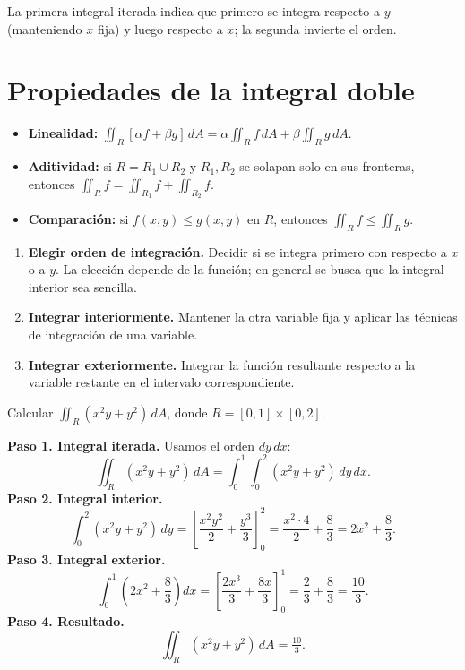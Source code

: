 La primera integral iterada indica que primero se integra respecto a $y$ (manteniendo $x$ fija) y luego respecto a $x$; la segunda invierte el orden.

\section{Propiedades de la integral doble}

\begin{itemize}
    \item \textbf{Linealidad:} $\iint_R [\alpha f+\beta g]\,dA = \alpha\iint_R f\,dA + \beta\iint_R g\,dA$.
    \item \textbf{Aditividad:} si $R=R_1\cup R_2$ y $R_1,R_2$ se solapan solo en sus fronteras, entonces $\iint_R f = \iint_{R_1} f + \iint_{R_2} f$.
    \item \textbf{Comparación:} si $f(x,y)\le g(x,y)$ en $R$, entonces $\iint_R f\le \iint_R g$.
\end{itemize}

\begin{pasos}
\begin{enumerate}
    \item \textbf{Elegir orden de integración.} Decidir si se integra primero con respecto a $x$ o a $y$. La elección depende de la función; en general se busca que la integral interior sea sencilla.
    \item \textbf{Integrar interiormente.} Mantener la otra variable fija y aplicar las técnicas de integración de una variable.
    \item \textbf{Integrar exteriormente.} Integrar la función resultante respecto a la variable restante en el intervalo correspondiente.
\end{enumerate}
\end{pasos}

\begin{example}
Calcular $\displaystyle\iint_R (x^2 y + y^2)\,dA$, donde $R=[0,1]\times[0,2]$.
\begin{myproof}
\textbf{Paso 1. Integral iterada.} Usamos el orden $dy\,dx$:
\[
\iint_R (x^2 y + y^2)\,dA
= \int_0^1\int_0^2 (x^2 y + y^2)\,dy\,dx.
\]
\textbf{Paso 2. Integral interior.}
\[
\int_0^2 (x^2 y + y^2)\,dy
= \left[\frac{x^2 y^2}{2} + \frac{y^3}{3}\right]_0^2
= \frac{x^2\cdot 4}{2} + \frac{8}{3}
= 2x^2+\frac{8}{3}.
\]
\textbf{Paso 3. Integral exterior.}
\[
\int_0^1 \left(2x^2+\frac{8}{3}\right)dx
= \left[\frac{2x^3}{3}+\frac{8x}{3}\right]_0^1
= \frac{2}{3}+\frac{8}{3}=\frac{10}{3}.
\]
\textbf{Paso 4. Resultado.}
\[
\boxed{\iint_R (x^2 y + y^2)\,dA = \tfrac{10}{3}.}
\]
\end{myproof}
\end{example}

